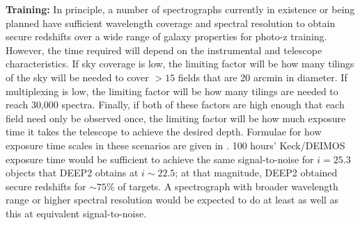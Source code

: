 {\bf Training:} In principle, a number of spectrographs currently in existence or being planned have sufficient wavelength coverage and spectral resolution to obtain secure redshifts over a wide range of galaxy properties for photo-z training.  However, the time required will depend on the instrumental and telescope characteristics.  If sky coverage is low, the limiting factor will be how many tilings of the sky will be needed to cover $>15$ fields that are 20 arcmin in diameter.  If multiplexing is low, the limiting factor will be how many tilings are needed to reach 30,000 spectra.  Finally, if both of these factors are high enough that each field need only be observed once, the limiting factor will be how much exposure time it takes the telescope to achieve the desired depth.  Formulae for how exposure time scales in these scenarios are given in \citet{Newman15}.
%
%
%
%
%
100 hours' Keck/DEIMOS exposure time would be sufficient to achieve the same signal-to-noise for $i=25.3$ objects that DEEP2 obtains at $i \sim 22.5$; at that magnitude, DEEP2 obtained secure redshifts for $\sim 75\%$ of targets.  A spectrograph with broader wavelength range or higher spectral resolution would be expected to do at least as well as this at equivalent signal-to-noise.

